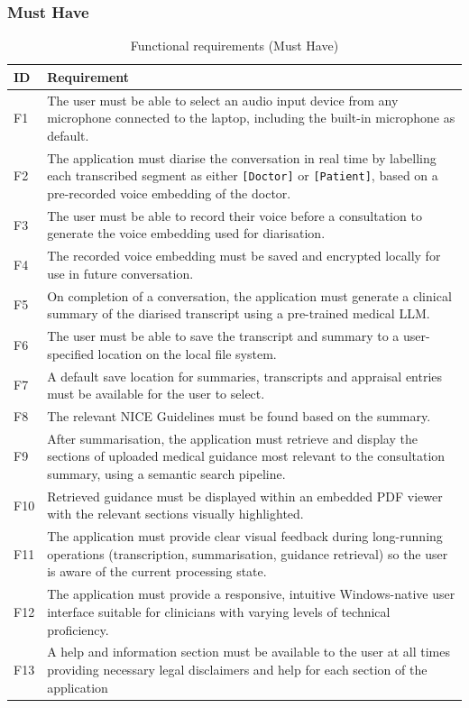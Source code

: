 \subsubsection{Must Have}

\begin{table}[H]
\centering
\begin{tabularx}{\textwidth}{l X}
\toprule
\textbf{ID} & \textbf{Requirement} \\
\midrule
F1 & The user must be able to select an audio input device from any microphone connected to the laptop, including the built-in microphone as default. \\
F2 & The application must diarise the conversation in real time by labelling each transcribed segment as either \texttt{[Doctor]} or \texttt{[Patient]}, based on a pre-recorded voice embedding of the doctor. \\
F3 & The user must be able to record their voice before a consultation to generate the voice embedding used for diarisation. \\
F4 & The recorded voice embedding must be saved and encrypted locally for use in future conversation. \\
F5 & On completion of a conversation, the application must generate a clinical summary of the diarised transcript using a pre-trained medical LLM. \\
F6 & The user must be able to save the transcript and summary to a user-specified location on the local file system. \\
F7 & A default save location for summaries, transcripts and appraisal entries must be available for the user to select. \\
F8 & The relevant NICE Guidelines must be found based on the summary. \\
F9 & After summarisation, the application must retrieve and display the sections of uploaded medical guidance most relevant to the consultation summary, using a semantic search pipeline. \\
F10 & Retrieved guidance must be displayed within an embedded PDF viewer with the relevant sections visually highlighted. \\
F11 & The application must provide clear visual feedback during long-running operations (transcription, summarisation, guidance retrieval) so the user is aware of the current processing state. \\
F12 & The application must provide a responsive, intuitive Windows-native user interface suitable for clinicians with varying levels of technical proficiency. \\
F13 & A help and information section must be available to the user at all times providing necessary legal disclaimers and help for each section of the application\\
\bottomrule
\end{tabularx}
\caption{Functional requirements (Must Have)}
\label{tab:fmreq}
\end{table}

